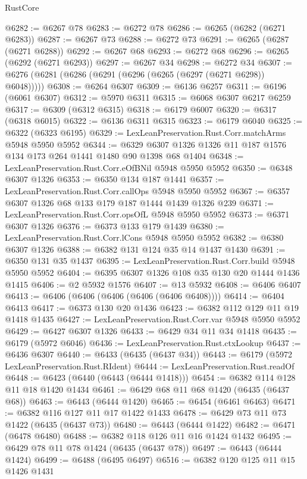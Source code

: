 \begin{lexlean}{RustCore}
\begin{coremodule}
{\begin{coremodule}
{{{{{{{{{{{{{{{{{{{{{{{{{{{{{{{{{{{{{{{{{{{{{@6282 := @6267 @78
@6283 := @6272 @78
@6286 := @6265 (@6282 (@6271 @6283))
@6287 := @6267 @73
@6288 := @6272 @73
@6291 := @6265 (@6287 (@6271 @6288))
@6292 := @6267 @68
@6293 := @6272 @68
@6296 := @6265 (@6292 (@6271 @6293))
@6297 := @6267 @34
@6298 := @6272 @34
@6307 := @6276 (@6281 (@6286 (@6291 (@6296 (@6265 (@6297 (@6271 @6298)) @6048)))))
@6308 := @6264 @6307
@6309 := @6136 @6257
@6311 := @6196 (@6061 @6307)
@6312 := @5970 @6311
@6315 := @6068 @6307 @6217 @6259
@6317 := @6309 (@6312 @6315)
@6318 := @6179 @6007
@6320 := @6317 (@6318 @6015)
@6322 := @6136 @6311 @6315
@6323 := @6179 @6040
@6325 := @6322 (@6323 @6195)
@6329 := LexLeanPreservation.Rust.Corr.matchArms @5948 @5950 @5952
@6344 := @6329 @6307 @1326 @1326 @11 @187 @1576 @134 @173 @264 @1441 @1480 @90 @1398 @68 @1404
@6348 := LexLeanPreservation.Rust.Corr.eOfBNil @5948 @5950 @5952
@6350 := @6348 @6307 @1326
@6353 := @6350 @134 @187 @1441
@6357 := LexLeanPreservation.Rust.Corr.callOps @5948 @5950 @5952
@6367 := @6357 @6307 @1326 @68 @133 @179 @187 @1444 @1439 @1326 @239
@6371 := LexLeanPreservation.Rust.Corr.opsOfL @5948 @5950 @5952
@6373 := @6371 @6307 @1326
@6376 := @6373 @133 @179 @1439
@6380 := LexLeanPreservation.Rust.Corr.lCons @5948 @5950 @5952
@6382 := @6380 @6307 @1326
@6388 := @6382 @131 @124 @35 @14 @1437 @1430
@6391 := @6350 @131 @35 @1437
@6395 := LexLeanPreservation.Rust.Corr.build @5948 @5950 @5952
@6404 := @6395 @6307 @1326 @108 @35 @130 @20 @1444 @1436 @1415
@6406 := @2 @5932 @1576
@6407 := @13 @5932
@6408 := @6406 @6407
@6413 := @6406 (@6406 (@6406 (@6406 (@6406 @6408))))
@6414 := @6404 @6413
@6417 := @6373 @130 @20 @1436
@6423 := @6382 @112 @129 @11 @19 @1418 @1435
@6427 := LexLeanPreservation.Rust.Corr.var @5948 @5950 @5952
@6429 := @6427 @6307 @1326
@6433 := @6429 @34 @11 @34 @1418
@6435 := @6179 (@5972 @6046)
@6436 := LexLeanPreservation.Rust.ctxLookup
@6437 := @6436 @6307
@6440 := @6433 (@6435 (@6437 @34))
@6443 := @6179 (@5972 LexLeanPreservation.Rust.RIdent)
@6444 := LexLeanPreservation.Rust.readOf
@6448 := @6423 (@6440 (@6443 (@6444 @1418)))
@6454 := @6382 @114 @128 @11 @18 @1420 @1434
@6461 := @6429 @68 @11 @68 @1420 (@6435 (@6437 @68))
@6463 := @6443 (@6444 @1420)
@6465 := @6454 (@6461 @6463)
@6471 := @6382 @116 @127 @11 @17 @1422 @1433
@6478 := @6429 @73 @11 @73 @1422 (@6435 (@6437 @73))
@6480 := @6443 (@6444 @1422)
@6482 := @6471 (@6478 @6480)
@6488 := @6382 @118 @126 @11 @16 @1424 @1432
@6495 := @6429 @78 @11 @78 @1424 (@6435 (@6437 @78))
@6497 := @6443 (@6444 @1424)
@6499 := @6488 (@6495 @6497)
@6516 := @6382
    @120
    @125
    @11
    @15
    @1426
    @1431
}}}}}}}}}}}}}}}}}}}}}}}}}}}}}}}}}}}}}}}}}}}}}
\end{coremodule}}
\end{coremodule}
\end{lexlean}
